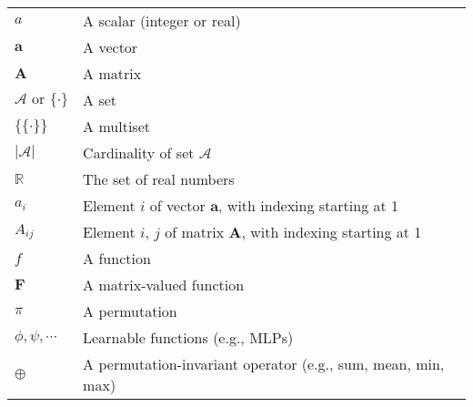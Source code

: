 \documentclass{article}
\begin{document}
\renewcommand\arraystretch{1.5}
\begin{tabular}{p{2cm}p{12cm}}
	$\displaystyle a$ & A scalar (integer or real) \\
	$\displaystyle \mathbf{a}$ & A vector \\
	$\displaystyle \mathbf{A}$ & A matrix \\
	$\displaystyle \mathcal{A}\text{ or }\{\cdot\}$ & A set \\
	$\displaystyle \{\!\{\cdot\}\!\}$ & A multiset \\
	$\displaystyle |\mathcal{A}|$ & Cardinality of set $\mathcal{A}$ \\
	$\displaystyle \mathbb{R}$ & The set of real numbers \\
	$\displaystyle a_i$ & Element $i$ of vector $\mathbf{a}$, with indexing starting at 1 \\
	$\displaystyle A_{ij}$ & Element $i$, $j$ of matrix $\mathbf{A}$, with indexing starting at 1 \\
	$\displaystyle f$ & A function \\
	$\displaystyle \bm{F}$ & A matrix-valued function \\
	$\displaystyle \pi$ & A permutation \\
	$\displaystyle \phi, \psi, \cdots$ & Learnable functions (e.g., MLPs) \\
	$\displaystyle \oplus$ & A permutation-invariant operator (e.g., sum, mean, min, max)
\end{tabular}
\end{document}
